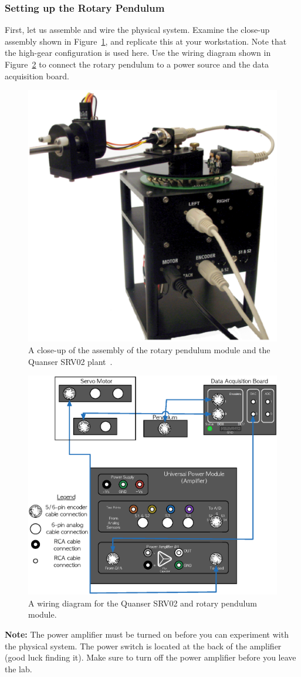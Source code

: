 \documentclass[12pt]{report}
\begin{document}
\subsubsection{Setting up the Rotary Pendulum}\label{subsubsection:lab2_setup}
First, let us assemble and wire the physical system. Examine the close-up assembly shown in Figure~\ref{fig:lab1a_assembly}, and replicate this at your workstation. Note that the high-gear configuration is used here. Use the wiring diagram shown in Figure~\ref{fig:lab1a_wiring} to connect the rotary pendulum to a power source and the data acquisition board.
\begin{figure}[htb!]
    \centering
    \includegraphics[width=.3\linewidth]{eps/lab_2/assembly.eps}
    \caption{A close-up of the assembly of the rotary pendulum module and the Quanser SRV02 plant~\cite{Q-Flex-Beam}.}
    \label{fig:lab1a_assembly}
\end{figure}
\begin{figure}[htb!]
    \centering
    \includegraphics[width=.7\linewidth]{eps/lab_2/wiring.eps}
    \caption{A wiring diagram for the Quanser SRV02 and rotary pendulum module.}
    \label{fig:lab1a_wiring}
\end{figure}

\textbf{Note:} The power amplifier must be turned on before you can experiment with the physical system. The power switch is located at the back of the amplifier (good luck finding it). Make sure to turn off the power amplifier before you leave the lab.
\end{document}
